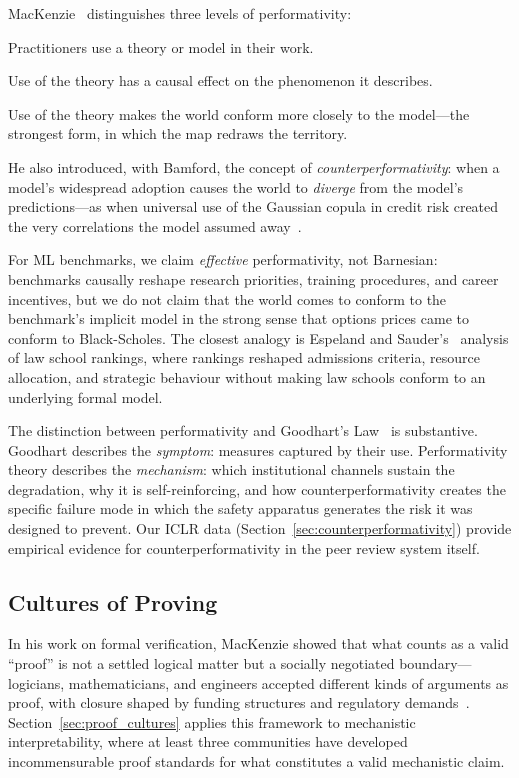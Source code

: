 \documentclass{article}
\begin{document}
MacKenzie~\citep{mackenzie_engine_2006} distinguishes three levels of performativity:

\begin{description}[leftmargin=1.5cm]
\item[Generic] Practitioners use a theory or model in their work.
\item[Effective] Use of the theory has a causal effect on the phenomenon it describes.
\item[Barnesian] Use of the theory makes the world conform more closely to the model---the strongest form, in which the map redraws the territory.
\end{description}

He also introduced, with Bamford, the concept of \textit{counterperformativity}: when a model's widespread adoption causes the world to \emph{diverge} from the model's predictions---as when universal use of the Gaussian copula in credit risk created the very correlations the model assumed away~\citep{mackenzie_bamford_2018}.

For ML benchmarks, we claim \textit{effective} performativity, not Barnesian: benchmarks causally reshape research priorities, training procedures, and career incentives, but we do not claim that the world comes to conform to the benchmark's implicit model in the strong sense that options prices came to conform to Black-Scholes. The closest analogy is Espeland and Sauder's~\citep{espeland_sauder_2007} analysis of law school rankings, where rankings reshaped admissions criteria, resource allocation, and strategic behaviour without making law schools conform to an underlying formal model.

The distinction between performativity and Goodhart's Law~\citep{goodhart_1975} is substantive. Goodhart describes the \textit{symptom}: measures captured by their use. Performativity theory describes the \textit{mechanism}: which institutional channels sustain the degradation, why it is self-reinforcing, and how counterperformativity creates the specific failure mode in which the safety apparatus generates the risk it was designed to prevent. Our ICLR data (Section~\ref{sec:counterperformativity}) provide empirical evidence for counterperformativity in the peer review system itself.

\subsection{Cultures of Proving}

In his work on formal verification, MacKenzie showed that what counts as a valid ``proof'' is not a settled logical matter but a socially negotiated boundary---logicians, mathematicians, and engineers accepted different kinds of arguments as proof, with closure shaped by funding structures and regulatory demands~\citep{mackenzie_mechanizing_2001}. Section~\ref{sec:proof_cultures} applies this framework to mechanistic interpretability, where at least three communities have developed incommensurable proof standards for what constitutes a valid mechanistic claim.
\end{document}
